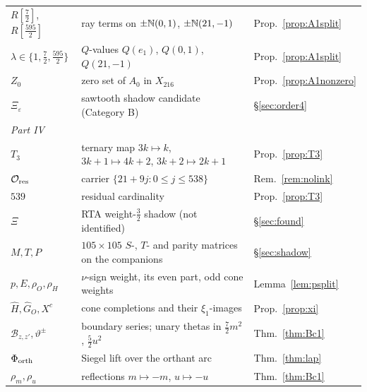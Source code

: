 \begin{center}
\begin{longtable}{p{3.2cm}p{9.3cm}p{2.4cm}}
$R[\frac72]$, $R[\frac{595}2]$ & ray terms on $\pm\mathbb{N}(0,1)$, $\pm\mathbb{N}(21,-1)$ & Prop.~\ref{prop:A1split}\\
$\lambda\in\{1,\frac72,\frac{595}2\}$ & $Q$-values $Q(e_1)$, $Q(0,1)$, $Q(21,-1)$ & Prop.~\ref{prop:A1split}\\
$Z_0$ & zero set of $A_0$ in $X_{216}$ & Prop.~\ref{prop:A1nonzero}\\
$\Xi_\varepsilon$ & sawtooth shadow candidate (Category B) & \S\ref{sec:order4}\\
\multicolumn{3}{l}{\emph{Part IV}}\\
$T_3$ & ternary map $3k\mapsto k$, $3k{+}1\mapsto4k{+}2$, $3k{+}2\mapsto2k{+}1$ & Prop.~\ref{prop:T3}\\
$\mathcal O_{\rm res}$ & carrier $\{21+9j:0\le j\le538\}$ & Rem.~\ref{rem:nolink}\\
$539$ & residual cardinality & Prop.~\ref{prop:T3}\\
$\Xi$ & RTA weight-$\frac32$ shadow (not identified) & \S\ref{sec:found}\\
$M,T,P$ & $105\times105$ $S$-, $T$- and parity matrices on the companions & \S\ref{sec:shadow}\\
$p,E,\rho_O,\rho_H$ & $\nu$-sign weight, its even part, odd cone weights & Lemma~\ref{lem:psplit}\\
$\widehat H,\widehat G_O,X^c$ & cone completions and their $\xi_1$-images & Prop.~\ref{prop:xi}\\
$\mathcal B_{z,z'},\vartheta^\pm$ & boundary series; unary thetas in $\frac72m^2$, $\frac52u^2$ & Thm.~\ref{thm:Bc1}\\
$\Phi_{\rm orth}$ & Siegel lift over the orthant arc & Thm.~\ref{thm:lap}\\
$\rho_m,\rho_u$ & reflections $m\mapsto-m$, $u\mapsto-u$ & Thm.~\ref{thm:Bc1}\\
\bottomrule
\end{longtable}
\end{center}
\clearpage
